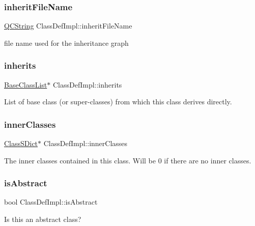 \subsubsection{\texorpdfstring{inheritFileName}{inheritFileName}}
{\footnotesize\ttfamily \mbox{\hyperlink{class_q_c_string}{Q\+C\+String}} Class\+Def\+Impl\+::inherit\+File\+Name}

file name used for the inheritance graph \mbox{\label{class_class_def_impl_a4dd8dc3a52eaf754b7d567a4dc3e0780}} 
\subsubsection{\texorpdfstring{inherits}{inherits}}
{\footnotesize\ttfamily \mbox{\hyperlink{class_base_class_list}{Base\+Class\+List}}$\ast$ Class\+Def\+Impl\+::inherits}

List of base class (or super-\/classes) from which this class derives directly. \mbox{\label{class_class_def_impl_a3032dc0d393588b7afd0c2432b350feb}} 
\subsubsection{\texorpdfstring{innerClasses}{innerClasses}}
{\footnotesize\ttfamily \mbox{\hyperlink{class_class_s_dict}{Class\+S\+Dict}}$\ast$ Class\+Def\+Impl\+::inner\+Classes}

The inner classes contained in this class. Will be 0 if there are no inner classes. \mbox{\label{class_class_def_impl_add7ec887a9774fff23c51033b0f68cd1}} 
\subsubsection{\texorpdfstring{isAbstract}{isAbstract}}
{\footnotesize\ttfamily bool Class\+Def\+Impl\+::is\+Abstract}

Is this an abstract class? \mbox{\label{class_class_def_impl_a435f18aa29bf28b0723ea7c7fd79b825}} 
